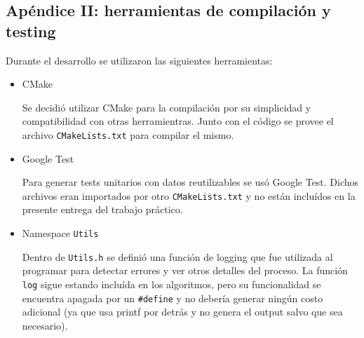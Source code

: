 	\subsection{Apéndice II: herramientas de compilación y testing}
	Durante el desarrollo se utilizaron las siguientes herramientas:

	\begin{itemize}
		\item CMake

		Se decidió utilizar CMake para la compilación por su simplicidad y compatibilidad con otras herramientras. Junto con el código se provee el archivo \texttt{CMakeLists.txt} para compilar el mismo.

		\item Google Test

		Para generar tests unitarios con datos reutilizables se usó Google Test. Dichos archivos eran importados por otro \texttt{CMakeLists.txt} y no están incluídos en la presente entrega del trabajo práctico.

		\item Namespace \texttt{Utils}

		Dentro de \texttt{Utils.h} se definió una función de logging que fue utilizada al programar para detectar errores y ver otros detalles del proceso. La función \texttt{log} sigue estando incluída en los algoritmos, pero su funcionalidad se encuentra apagada por un \texttt{\#define} y no debería generar ningún costo adicional (ya que usa printf por detrás y no genera el output salvo que sea necesario).
	\end{itemize}